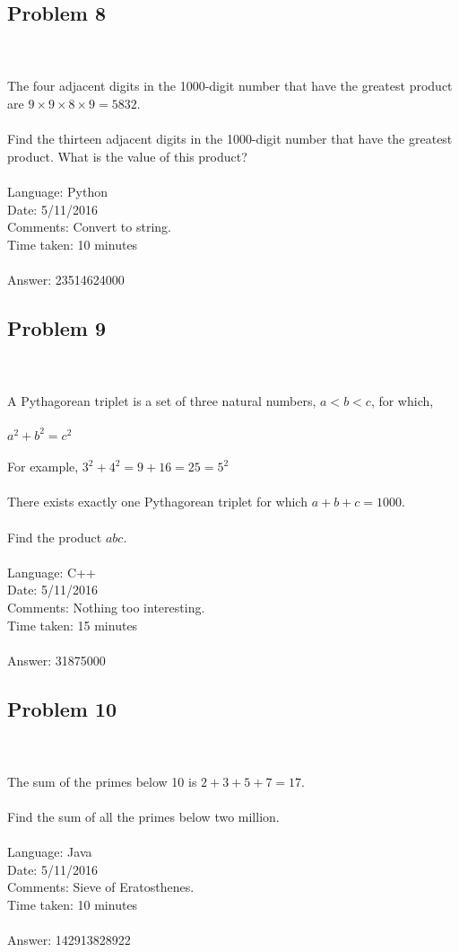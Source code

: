 \documentclass[fleqn]{article}
\begin{document}
\subsection{Problem 8} ~\\
	\\
	The four adjacent digits in the 1000-digit number that have the greatest product are $9 \times 9 \times 8 \times 9 = 5832$.\\
	\\
	Find the thirteen adjacent digits in the 1000-digit number that have the greatest product. What is the value of this product?\\
	\\
	Language: Python\\
	Date: 5/11/2016 \\
	Comments: Convert to string.\\
	Time taken: 10 minutes\\
	\\
	Answer:  23514624000\\
\pagebreak
\subsection{Problem 9} ~\\
	\\
	A Pythagorean triplet is a set of three natural numbers, $a < b < c$, for which,\\
	\\
	$a^{2} + b^{2} = c^{2}$\\
	\\
	For example, $3^{2} + 4^{2} = 9 + 16 = 25 = 5^{2}$\\
	\\
	There exists exactly one Pythagorean triplet for which $a + b + c = 1000$.\\
	\\
	Find the product $abc$.\\
	\\
	Language: C++\\
	Date: 5/11/2016 \\
	Comments: Nothing too interesting.\\
	Time taken: 15 minutes\\
	\\
	Answer:  31875000\\
	
\subsection{Problem 10} ~\\
	\\
	The sum of the primes below 10 is $2 + 3 + 5 + 7 = 17$.\\
	\\
	Find the sum of all the primes below two million.\\
	\\
	Language: Java\\
	Date: 5/11/2016 \\
	Comments: Sieve of Eratosthenes.\\
	Time taken: 10 minutes\\
	\\
	Answer: 142913828922\\
\end{document}
